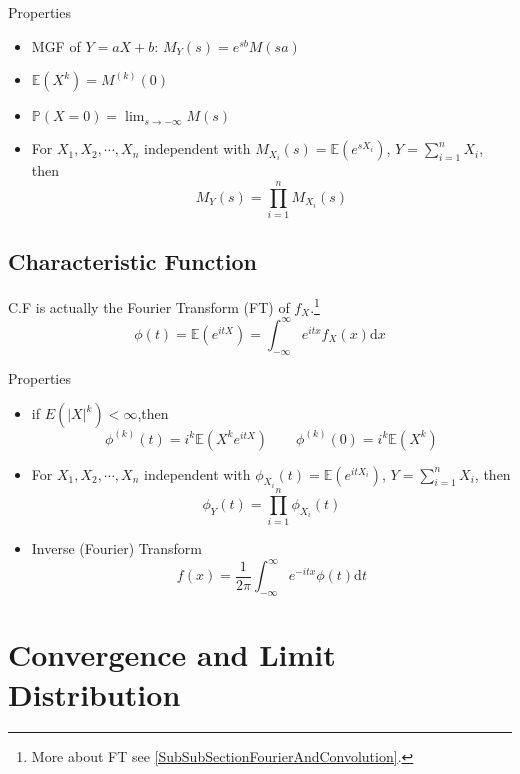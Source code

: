     Properties
    \begin{itemize}
        \item MGF of $Y=aX+b$: $
            M_Y(s)=e^{sb}M(sa)    $
        \item $\mathbb{E}(X^k)=M^{(k)}(0)$
        \item $\mathbb{P}(X=0)={\displaystyle\lim_{s\to -\infty}}M(s)$
        \item For $X_1,X_2,\cdots,X_n$ independent with $M_{X_i}(s)=\mathbb{E}(e^{sX_i})$, $Y={\displaystyle \sum_{i=1}^n} X_i$, then
        \begin{equation}    
            M_Y(s)=\prod_{i=1}^n M_{X_i}(s)
        \end{equation}
    \end{itemize}
\subsection{Characteristic Function}
    C.F is actually the Fourier Transform (FT) of $f_X$.\footnote{More about FT see \autoref{SubSubSectionFourierAndConvolution}.}
    \begin{equation}
        \phi(t)=\mathbb{E}(e^{itX}) = \int_{-\infty}^\infty e^{itx}f_X(x)\mathrm{d}x
    \end{equation}

    Properties
    \begin{itemize}
    \item if $E(|X|^k)<\infty$,then
    \begin{equation}
        \phi^{(k)}(t)=i^k\mathbb{E}(X^ke^{itX})\qquad \phi^{(k)}(0)=i^k\mathbb{E}(X^k)    
    \end{equation}
    \item For $X_1,X_2,\cdots,X_n$ independent with $\phi_{X_i}(t)=\mathbb{E}(e^{itX_i})$, $Y={\displaystyle \sum_{i=1}^n} X_i$, then
    \begin{equation}
        \phi_Y(t)=\prod_{i=1}^n \phi_{X_i}(t)
    \end{equation}
    \item Inverse (Fourier) Transform 
    \begin{equation}
        f(x)=\frac{1}{2\pi}\int_{-\infty}^\infty e^{-itx}\phi(t)\mathrm{d}t    
    \end{equation}
\end{itemize}



\section{Convergence and Limit Distribution}
